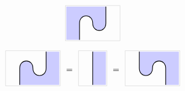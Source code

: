 \documentclass[a4paper,12pt]{article}
\theoremstyle{definition}
\renewcommand{\-}[0]{\nobreakdash-\hspace{0pt}}
\def\syntaxfill{blue!20}
\begin{document}
\begin{gather}
\begin{aligned}
\begin{tikzpicture}[xscale=\compactwidthscale, yscale=-\compactheightscale]
\node (a) at (0,0) {};
\node (b) at (0,1) {};
\node (c) at (-1,1) {};
\node (d) at (-2,1) {};
\node (e) at (-2,2) {};
\draw [fill=\syntaxfill, draw=none] (a.center)
    to (b.center)
    to [out=up, in=up, looseness=1.5] (c.center)
    to [out=down, in=down, looseness=1.5] (d.center)
    to (e.center)
    to (-3,2) to (-3,0) to (0,0);
\draw [thick] (a.center)
    to (b.center)
    to [out=up, in=up, looseness=1.5] (c.center)
    to [out=down, in=down, looseness=1.5] (d.center)
    to (e.center);
\draw [white] (1,0) to (1,1);
\drawspecialboxA
\end{tikzpicture}
\end{aligned}
\\
\label{eq:top2}
\begin{aligned}
\begin{tikzpicture}[xscale=-\compactwidthscale, yscale=\compactheightscale]
\node (a) at (0,0) {};
\node (b) at (0,1) {};
\node (c) at (-1,1) {};
\node (d) at (-2,1) {};
\node (e) at (-2,2) {};
\draw [fill=\syntaxfill, draw=none] (a.center)
    to (b.center)
    to [out=up, in=up, looseness=1.5] (c.center)
    to [out=down, in=down, looseness=1.5] (d.center)
    to (e.center)
    to (-3,2) to (-3,0) to (0,0);
\draw [thick] (a.center)
    to (b.center)
    to [out=up, in=up, looseness=1.5] (c.center)
    to [out=down, in=down, looseness=1.5] (d.center)
    to (e.center);
\draw [white] (1,0) to (1,1);
\drawspecialboxA
\end{tikzpicture}
\end{aligned}
\hspace{4pt}
=
\hspace{4pt}
\begin{aligned}
\begin{tikzpicture}[xscale=-\compactwidthscale, yscale=\compactheightscale]
\node (a) at (0,0) {};
\node (e) at (0,2) {};
\draw [fill=\syntaxfill, draw=none] (a.center)
    to (e.center)
    to (-1,2) to (-1,0) to (0,0);
\draw [thick] (a.center)
    to (e.center);
\draw [white] (1,0) to (1,1);
\drawspecialboxB
\end{tikzpicture}
\end{aligned}
\hspace{4pt}
=
\hspace{4pt}
\begin{aligned}
\begin{tikzpicture}[xscale=-\compactwidthscale, yscale=-\compactheightscale]
\node (a) at (0,0) {};
\node (b) at (0,1) {};
\node (c) at (-1,1) {};
\node (d) at (-2,1) {};
\node (e) at (-2,2) {};
\draw [fill=\syntaxfill, draw=none] (a.center)
    to (b.center)
    to [out=up, in=up, looseness=1.5] (c.center)
    to [out=down, in=down, looseness=1.5] (d.center)
    to (e.center)
    to (-3,2) to (-3,0) to (0,0);
\draw [thick] (a.center)
    to (b.center)
    to [out=up, in=up, looseness=1.5] (c.center)
    to [out=down, in=down, looseness=1.5] (d.center)
    to (e.center);
\draw [white] (1,0) to (1,1);
\drawspecialboxA
\end{tikzpicture}
\end{aligned}
\end{gather}
\end{document}
